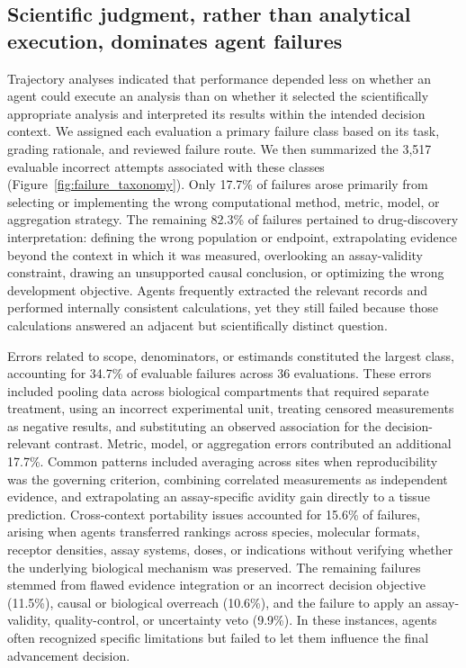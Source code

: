 \documentclass[10pt,letterpaper]{article}
\begin{document}
\subsection{Scientific judgment, rather than analytical execution, dominates agent failures}
Trajectory analyses indicated that performance depended less on whether an agent could execute an analysis than on whether it selected the scientifically appropriate analysis and interpreted its results within the intended decision context. We assigned each evaluation a primary failure class based on its task, grading rationale, and reviewed failure route. We then summarized the 3,517 evaluable incorrect attempts associated with these classes (Figure~\ref{fig:failure_taxonomy}). Only 17.7\% of failures arose primarily from selecting or implementing the wrong computational method, metric, model, or aggregation strategy. The remaining 82.3\% of failures pertained to drug-discovery interpretation: defining the wrong population or endpoint, extrapolating evidence beyond the context in which it was measured, overlooking an assay-validity constraint, drawing an unsupported causal conclusion, or optimizing the wrong development objective. Agents frequently extracted the relevant records and performed internally consistent calculations, yet they still failed because those calculations answered an adjacent but scientifically distinct question.
\par
Errors related to scope, denominators, or estimands constituted the largest class, accounting for 34.7\% of evaluable failures across 36 evaluations. These errors included pooling data across biological compartments that required separate treatment, using an incorrect experimental unit, treating censored measurements as negative results, and substituting an observed association for the decision-relevant contrast. Metric, model, or aggregation errors contributed an additional 17.7\%. Common patterns included averaging across sites when reproducibility was the governing criterion, combining correlated measurements as independent evidence, and extrapolating an assay-specific avidity gain directly to a tissue prediction. Cross-context portability issues accounted for 15.6\% of failures, arising when agents transferred rankings across species, molecular formats, receptor densities, assay systems, doses, or indications without verifying whether the underlying biological mechanism was preserved. The remaining failures stemmed from flawed evidence integration or an incorrect decision objective (11.5\%), causal or biological overreach (10.6\%), and the failure to apply an assay-validity, quality-control, or uncertainty veto (9.9\%). In these instances, agents often recognized specific limitations but failed to let them influence the final advancement decision.
\end{document}
